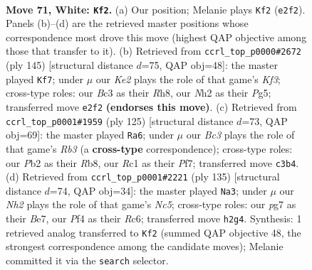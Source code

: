 \documentclass[11pt]{article}
\begin{document}
\clearpage

\begin{figure}[p]\centering
\begin{subfigure}{0.46\textwidth}\centering
\resizebox{\linewidth}{!}{%
\newchessgame
\chessboard[
  setfen={5k2/6p1/p2b2rr/Pppb1p1p/2p2P1P/2B1P1P1/1P2K2N/2R3R1 w - - 14 71},
  showmover=false,
  pgfstyle=straightmove, color=movearrow, markmove={e2-f2}
]}
\caption{}
\end{subfigure}\hfill
\begin{subfigure}{0.46\textwidth}\centering
\resizebox{\linewidth}{!}{%
\newchessgame
\chessboard[
  setfen={4r2r/2pbp3/1p1p1k2/pP1P1Pp1/P1P1R1P1/5B2/4R1K1/8 b - - 12 73},
  showmover=false,
  pgfstyle=straightmove, color=movearrow, markmove={f6-f7}
]}
\caption{}
\end{subfigure}
\\[4pt]
\begin{subfigure}{0.46\textwidth}\centering
\resizebox{\linewidth}{!}{%
\newchessgame
\chessboard[
  setfen={1r6/4kp2/1r1p1p2/p1p1pPb1/P1P1P2p/1PRR3P/5BP1/4K3 b - - 63 63},
  showmover=false,
  pgfstyle=straightmove, color=movearrow, markmove={b6-a6}
]}
\caption{}
\end{subfigure}\hfill
\begin{subfigure}{0.46\textwidth}\centering
\resizebox{\linewidth}{!}{%
\newchessgame
\chessboard[
  setfen={3r4/p3bkp1/Ppr1p1p1/5pP1/2nP1P1P/2PB4/4R1K1/R3B3 b - - 50 68},
  showmover=false,
  pgfstyle=straightmove, color=movearrow, markmove={c4-a3}
]}
\caption{}
\end{subfigure}
\caption{\textbf{Move 71, White: \texttt{Kf2}.} (a) Our position; Melanie plays \texttt{Kf2} (\texttt{e2f2}). Panels (b)--(d) are the retrieved master positions whose correspondence most drove this move (highest QAP objective among those that transfer to it). (b) Retrieved from \texttt{ccrl\_top\_p0000\#2672} (ply 145) [structural distance $d$=75, QAP obj=48]: the master played \texttt{Kf7}; under $\mu$ our \emph{Ke2} plays the role of that game's \emph{Kf3}; cross-type roles: our \emph{B}c3 as their \emph{R}h8, our \emph{N}h2 as their \emph{P}g5; transferred move \texttt{e2f2} \textbf{(endorses this move)}. (c) Retrieved from \texttt{ccrl\_top\_p0001\#1959} (ply 125) [structural distance $d$=73, QAP obj=69]: the master played \texttt{Ra6}; under $\mu$ our \emph{Bc3} plays the role of that game's \emph{Rb3} (a \textbf{cross-type} correspondence); cross-type roles: our \emph{P}b2 as their \emph{R}b8, our \emph{R}c1 as their \emph{P}f7; transferred move \texttt{c3b4}. (d) Retrieved from \texttt{ccrl\_top\_p0001\#2221} (ply 135) [structural distance $d$=74, QAP obj=34]: the master played \texttt{Na3}; under $\mu$ our \emph{Nh2} plays the role of that game's \emph{Nc5}; cross-type roles: our \emph{p}g7 as their \emph{B}e7, our \emph{P}f4 as their \emph{R}c6; transferred move \texttt{h2g4}. Synthesis: 1 retrieved analog transferred to \texttt{Kf2} (summed QAP objective 48, the strongest correspondence among the candidate moves); Melanie committed it via the \texttt{search} selector.}
\label{fig:thought-m140}
\end{figure}
\end{document}
